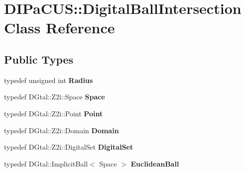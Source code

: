 \hypertarget{classDIPaCUS_1_1DigitalBallIntersection}{}\section{D\+I\+Pa\+C\+US\+:\+:Digital\+Ball\+Intersection Class Reference}
\label{classDIPaCUS_1_1DigitalBallIntersection}
\subsection*{Public Types}
\begin{DoxyCompactItemize}
\item 
\mbox{\label{classDIPaCUS_1_1DigitalBallIntersection_ac2e8e7f5500b88ce18397b507950f303}} 
typedef unsigned int {\bfseries Radius}
\item 
\mbox{\label{classDIPaCUS_1_1DigitalBallIntersection_acfd9316724aeb3deca0cc2f8e62c25d9}} 
typedef D\+Gtal\+::\+Z2i\+::\+Space {\bfseries Space}
\item 
\mbox{\label{classDIPaCUS_1_1DigitalBallIntersection_ab802044b976e747681f694ba1c6ba29d}} 
typedef D\+Gtal\+::\+Z2i\+::\+Point {\bfseries Point}
\item 
\mbox{\label{classDIPaCUS_1_1DigitalBallIntersection_a78914f20bd1759d4ab97311e8fc0a6f1}} 
typedef D\+Gtal\+::\+Z2i\+::\+Domain {\bfseries Domain}
\item 
\mbox{\label{classDIPaCUS_1_1DigitalBallIntersection_a246a1e34d282336c41782c60770873bd}} 
typedef D\+Gtal\+::\+Z2i\+::\+Digital\+Set {\bfseries Digital\+Set}
\item 
\mbox{\label{classDIPaCUS_1_1DigitalBallIntersection_aad50b078549524b55fd5e890f41f441c}} 
typedef D\+Gtal\+::\+Implicit\+Ball$<$ Space $>$ {\bfseries Euclidean\+Ball}
\end{DoxyCompactItemize}
